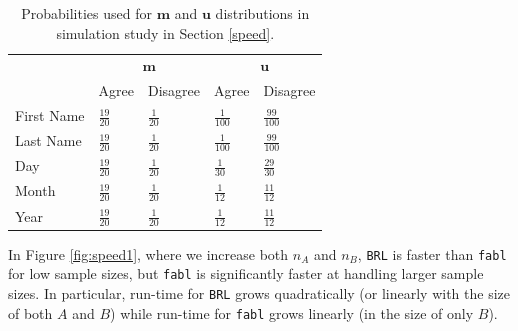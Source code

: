 \documentclass[ba]{imsart}
\begin{document}
	
	
	\begin{table}[t]
		\centering
		\begin{tabular}{lll|ll}
			\multicolumn{1}{c}{ } & \multicolumn{2}{c}{$\bm{m}$} & \multicolumn{2}{c}{$\bm{u}$} \\
			\cline{2-3} \cline{4-5}
			& Agree & Disagree & Agree & Disagree \\
			\hline
			First Name & $\frac{19}{20}$ & $\frac{1}{20}$ & $\frac{1}{100}$ &  $\frac{99}{100}$ \\ 
			Last Name & $\frac{19}{20}$ & $\frac{1}{20}$ & $\frac{1}{100}$ &  $\frac{99}{100}$ \\ 
			Day & $\frac{19}{20}$ & $\frac{1}{20}$ & $\frac{1}{30}$ &  $\frac{29}{30}$ \\ 
			Month & $\frac{19}{20}$ & $\frac{1}{20}$ & $\frac{1}{12}$ &  $\frac{11}{12}$ \\ 
			Year & $\frac{19}{20}$ & $\frac{1}{20}$ & $\frac{1}{12}$ &  $\frac{11}{12}$ \\  
			\hline
		\end{tabular}
		\caption{Probabilities used for $\bm{m}$ and $\bm{u}$ distributions in simulation study in Section \ref{speed}.}\label{Tab:distributions}
	\end{table}
	
	In Figure \ref{fig:speed1}, where we increase both $n_A$ and $n_B$, \texttt{BRL} is faster than \texttt{fabl} for low sample sizes, but \texttt{fabl} is significantly faster at handling larger sample sizes. In particular, run-time for \texttt{BRL} grows quadratically (or linearly with the size of both $A$ and $B$) while run-time for \texttt{fabl} grows linearly (in the size of only $B$).
	
\end{document}
